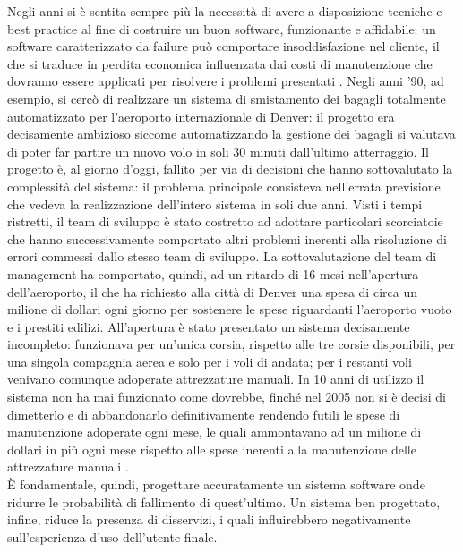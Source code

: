 Negli anni si è sentita sempre più la necessità di avere a disposizione tecniche e best practice al fine di costruire un buon software, funzionante e affidabile: un software caratterizzato da failure può comportare insoddisfazione nel cliente, il che si traduce in perdita economica influenzata dai costi di manutenzione che dovranno essere applicati per risolvere i problemi presentati \cite{bruegge2009object}. Negli anni '90, ad esempio, si cercò di realizzare un sistema di smistamento dei bagagli totalmente automatizzato per l'aeroporto internazionale di Denver: il progetto era decisamente ambizioso siccome automatizzando la gestione dei bagagli si valutava di poter far partire un nuovo volo in soli 30 minuti dall'ultimo atterraggio. Il progetto è, al giorno d'oggi, fallito per via di decisioni che hanno sottovalutato la complessità del sistema: il problema principale consisteva nell'errata previsione che vedeva la realizzazione dell'intero sistema in soli due anni. Visti i tempi ristretti, il team di sviluppo è stato costretto ad adottare particolari scorciatoie che hanno successivamente comportato altri problemi inerenti alla risoluzione di errori commessi dallo stesso team di sviluppo. La sottovalutazione del team di management ha comportato, quindi, ad un ritardo di 16 mesi nell'apertura dell'aeroporto, il che ha richiesto alla città di Denver una spesa di circa un milione di dollari ogni giorno per sostenere le spese riguardanti l'aeroporto vuoto e i prestiti edilizi. All'apertura è stato presentato un sistema decisamente incompleto: funzionava per un'unica corsia, rispetto alle tre corsie disponibili, per una singola compagnia aerea e solo per i voli di andata; per i restanti voli venivano comunque adoperate attrezzature manuali. In 10 anni di utilizzo il sistema non ha mai funzionato come dovrebbe, finché nel 2005 non si è decisi di dimetterlo e di abbandonarlo definitivamente rendendo futili le spese di manutenzione adoperate ogni mese, le quali ammontavano ad un milione di dollari in più ogni mese rispetto alle spese inerenti alla manutenzione delle attrezzature manuali \cite{denver}.\\
È fondamentale, quindi, progettare accuratamente un sistema software onde ridurre le probabilità di fallimento di quest'ultimo. Un sistema ben progettato, infine, riduce la presenza di disservizi, i quali influirebbero negativamente sull'esperienza d'uso dell'utente finale.


